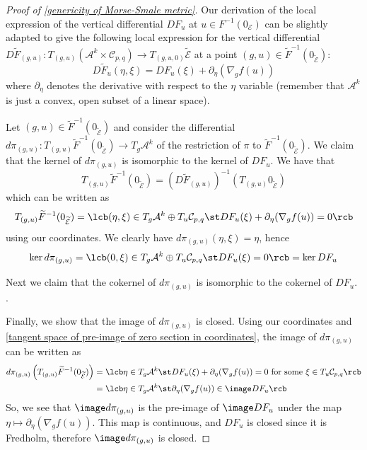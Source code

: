 \begin{proof}[Proof of \cref{genericity of Morse-Smale metric}]
Our derivation of the local expression of the vertical differential $DF_u$ at $u \in F^{-1}(0_{\mathcal E})$ can be slightly adapted to give the following local expression for the vertical differential $D\widetilde F_{(g,u)} : T_{(g,u)} (\mathcal A^k \times \mathcal C_{p,q}) \rightarrow T_{(g,u,0)} \mathcal{\widetilde E}$ at a point $(g,u) \in \widetilde F^{-1}(0_{\widetilde{\mathcal E}})$:
\[ D\widetilde F_u(\eta,\xi) = DF_u(\xi) + \partial_\eta(\nabla_g f(u)) \]
where $\partial_\eta$ denotes the derivative with respect to the $\eta$ variable (remember that $\mathcal A^k$ is just a convex, open subset of a linear space).

Let $(g,u) \in \widetilde F^{-1}(0_{\widetilde{\mathcal E}})$ and consider the differential $d\pi_{(g,u)} : T_{(g,u)} \widetilde F^{-1}(0_{\widetilde{\mathcal E}}) \rightarrow T_g \mathcal A^k$ of the restriction of $\pi$ to $\widetilde F^{-1}(0_{\widetilde{\mathcal E}})$. We claim that the kernel of $d\pi_{(g,u)}$ is isomorphic to the kernel of $DF_u$. We have that
\[ T_{(g,u)} \widetilde F^{-1}(0_{\widetilde{\mathcal E}}) = (D\widetilde F_{(g,u)})^{-1}(T_{(g,u)} 0_{\widetilde{\mathcal E}}) \]
which can be written as
\begin{equation}
\label{tangent space of pre-image of zero section in coordinates}
T_{(g,u)} \widetilde F^{-1}(0_{\widetilde{\mathcal E}}) = \lcb (\eta,\xi) \in T_g \mathcal A^k \oplus T_u \mathcal C_{p,q} \st DF_u(\xi) + \partial_\eta(\nabla_g f(u)) = 0 \rcb 
\end{equation}
using our coordinates. We clearly have $d\pi_{(g,u)}(\eta,\xi) = \eta$, hence
\[ \ker d\pi_{(g,u)} = \lcb (0,\xi) \in T_g \mathcal A^k \oplus T_u \mathcal C_{p,q} \st DF_u(\xi) = 0 \rcb = \ker DF_u \]

Next we claim that the cokernel of $d\pi_{(g,u)}$ is isomorphic to the cokernel of $DF_u$. .

Finally, we show that the image of $d\pi_{(g,u)}$ is closed. Using our coordinates and \eqref{tangent space of pre-image of zero section in coordinates}, the image of $d\pi_{(g,u)}$ can be written as
\begin{align*}
	d\pi_{(g,u)} \left( T_{(g,u)} \widetilde F^{-1}(0_{\widetilde{\mathcal E}}) \right) &= \lcb \eta \in T_g \mathcal A^k \st DF_u(\xi) + \partial_\eta(\nabla_g f(u)) = 0 \text{ for some } \xi \in T_u \mathcal C_{p,q} \rcb \\
	&= \lcb \eta \in T_g \mathcal A^k \st \partial_\eta (\nabla_g f(u)) \in \image DF_u \rcb
\end{align*}
So, we see that $\image d\pi_{(g,u)}$ is the pre-image of $\image DF_u$ under the map $\eta \mapsto \partial_\eta(\nabla_g f(u))$. This map is continuous, and $DF_u$ is closed since it is Fredholm, therefore $\image d\pi_{(g,u)}$ is closed.
\end{proof}





